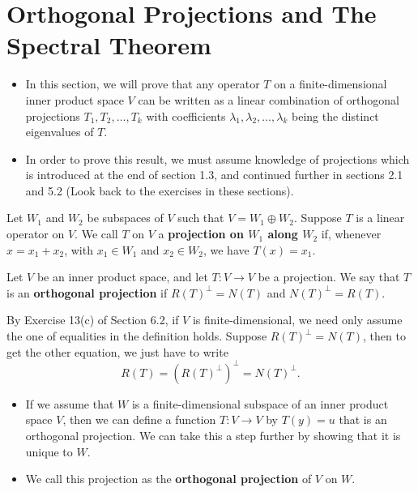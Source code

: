 \section{Orthogonal Projections and The Spectral Theorem}

\begin{itemize}
    \item In this section, we will prove that any operator \( T  \) on a finite-dimensional inner product space \( V  \) can be written as a linear combination of orthogonal projections \( {T}_{1}, {T}_{2}, \dots, {T}_{k} \) with coefficients \( {\lambda}_{1}, {\lambda}_{2}, \dots, {\lambda}_{k} \) being the distinct eigenvalues of \( T  \).
    \item In order to prove this result, we must assume knowledge of projections which is introduced at the end of section 1.3, and continued further in sections 2.1 and 5.2 (Look back to the exercises in these sections).
\end{itemize}

\begin{definition}[Projections]
   Let \( {W}_{1}  \) and \( {W}_{2}  \) be subspaces of \( V  \) such that \( V = {W}_{1} \oplus {W}_{2}  \). Suppose \( T  \) is a linear operator on \( V  \). We call \( T  \) on \( V  \) a \textbf{projection on \( {W}_{1} \) along \( {W}_{2} \)} if, whenever \( x = {x}_{1} + {x}_{2} \), with \( {x}_{1} \in {W}_{1} \) and \( {x}_{2} \in {W}_{2} \), we have \( T(x) = {x}_{1} \). 
\end{definition}

\begin{definition}
    Let \( V  \) be an inner product space, and let \( T: V \to V  \) be a projection. We say that \( T  \) is an \textbf{orthogonal projection} if \( R(T)^{\perp} = N(T) \) and \( N(T)^{\perp} = R(T) \).
\end{definition}

\begin{remark}
    By Exercise 13(c) of Section 6.2, if \( V  \) is finite-dimensional, we need only assume the one of equalities in the definition holds. Suppose \( R(T)^{\perp} = N(T) \), then to get the other equation, we just have to write
    \[  R(T) = (R(T)^{\perp})^{\perp} = N(T)^{\perp}.  \]
\end{remark}

\begin{itemize}
    \item If we assume that \( W  \) is a finite-dimensional subspace of an inner product space \( V  \), then we can define a function \( T: V \to V  \) by \( T(y) = u  \) that is an orthogonal projection. We can take this a step further by showing that it is unique to \( W  \). 
    \item We call this projection as the \textbf{orthogonal projection} of \( V  \) on \( W  \).
\end{itemize}

